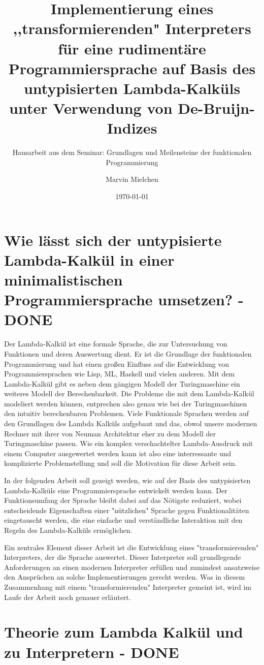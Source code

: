 \documentclass[ngerman]{article}
\title{Implementierung eines ,,transformierenden" Interpreters für eine rudimentäre Programmiersprache auf Basis des untypisierten Lambda-Kalküls unter Verwendung von De-Bruijn-Indizes}
\author{Marvin Mielchen}
\subtitle{Hausarbeit aus dem Seminar: Grundlagen und Meilensteine der funktionalen Programmierung}
\date{\today}
\begin{document}
\maketitle


\section{Wie lässt sich der untypisierte Lambda-Kalkül in einer minimalistischen Programmiersprache umsetzen? - DONE}

Der Lambda-Kalkül ist eine formale Sprache, die zur Untersuchung von Funktionen und deren Auswertung dient. Er ist die Grundlage der funktionalen Programmierung und hat einen großen Einfluss auf die Entwicklung von Programmiersprachen wie Lisp, ML, Haskell und vielen anderen.
Mit dem Lambda-Kalkül gibt es neben dem gängigen Modell der Turingmaschine ein weiteres Modell der Berechenbarkeit. 
Die Probleme die mit dem Lambda-Kalkül modeliert werden können, entprechen also genau wie bei der Turingmaschinen den intuitiv berechenbaren Problemen.
Viele Funktionale Sprachen werden auf den Grundlagen des Lambda Kalküls aufgebaut und das, obwol unsere modernen Rechner mit ihrer von Neuman Architektur eher zu dem Modell der Turingmaschine passen.
Wie ein komplex verschachtelter Lambda-Ausdruck mit einem Computer ausgewertet werden kann ist also eine interressante und komplizierte Problemstellung und soll die Motivation für diese Arbeit sein.

In der folgenden Arbeit soll gezeigt werden, wie auf der Basis des untypisierten Lambda-Kalküls eine Programmiersprache entwickelt werden kann. Der Funktionsumfang der Sprache bleibt dabei auf das Nötigste reduziert, wobei entscheidende Eigenschaften einer "nützlichen" Sprache gegen Funktionalitäten eingetauscht werden, die eine einfache und verständliche Interaktion mit den Regeln des Lambda-Kalküls ermöglichen.

Ein zentrales Element dieser Arbeit ist die Entwicklung eines "transformierenden" Interpreters, der die Sprache auswertet. Dieser Interpreter soll grundlegende Anforderungen an einen modernen Interpreter erfüllen und zumindest ansatzweise den Ansprüchen an solche Implementierungen gerecht werden.
Was in diesem Zusammenhang mit einem "transformierenden" Interpreter gemeint ist, wird im Laufe der Arbeit noch genauer erläutert.

\section{Theorie zum Lambda Kalkül und zu Interpretern - DONE}
\end{document}
